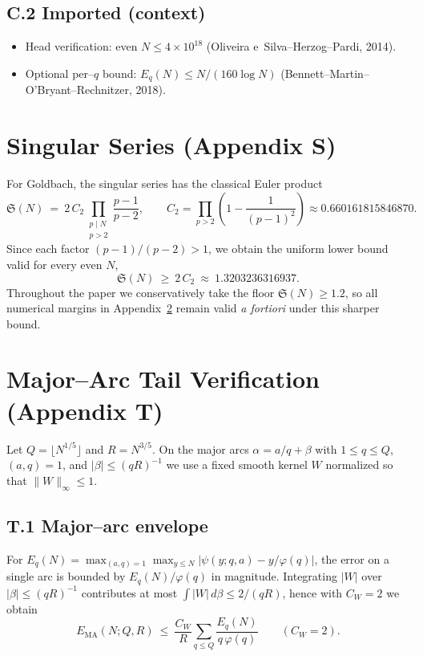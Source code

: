 \documentclass[11pt]{article}
\theoremstyle{remark}
\newcommand{\Sseries}{\mathfrak S}
\newcommand{\QQ}{\ensuremath{Q}}
\newcommand{\RR}{\ensuremath{R}}
\begin{document}
\subsection*{C.2 Imported (context)}
\begin{itemize}
  \item Head verification: even $N\le 4\times 10^{18}$ (Oliveira e~Silva--Herzog--Pardi, 2014).
  \item Optional per–$q$ bound: $E_q(N)\le N/(160\log N)$ (Bennett--Martin--O'Bryant--Rechnitzer, 2018).
\end{itemize}

\section{Singular Series (Appendix S)}\label{app:singular}
For Goldbach, the singular series has the classical Euler product
\[
\Sseries(N)\ =\ 2\,C_2 \prod_{\substack{p\mid N\\ p>2}}\frac{p-1}{p-2},
\qquad
C_2=\prod_{p>2}\left(1-\frac{1}{(p-1)^2}\right)\approx 0.660161815846870.
\]
Since each factor $(p-1)/(p-2)>1$, we obtain the uniform lower bound valid for every even $N$,
\[
\Sseries(N)\ \ge\ 2\,C_2\ \approx\ 1.3203236316937.
\]
Throughout the paper we conservatively take the floor $\Sseries(N)\ge 1.2$, so all numerical margins in Appendix~\ref{app:tail} remain valid \emph{a fortiori} under this sharper bound.

\section{Major--Arc Tail Verification (Appendix T)}\label{app:tail}
Let $\QQ=\lfloor N^{1/5}\rfloor$ and $\RR=N^{3/5}$. On the major arcs $\alpha=a/q+\beta$ with $1\le q\le \QQ$, $(a,q)=1$, and $|\beta|\le (q\RR)^{-1}$ we use a fixed smooth kernel $W$ normalized so that $\|W\|_\infty\le 1$.

\subsection*{T.1 Major–arc envelope}
For $E_q(N)=\max_{(a,q)=1}\max_{y\le N}\bigl|\psi(y;q,a)-y/\varphi(q)\bigr|$, the error on a single arc is bounded by $E_q(N)/\varphi(q)$ in magnitude. Integrating $|W|$ over $|\beta|\le (q\RR)^{-1}$ contributes at most $\int|W|\,d\beta\le 2/(q\RR)$, hence with $C_W=2$ we obtain
\[
E_{\mathrm{MA}}(N;\QQ,\RR)\ \le\ \frac{C_W}{\RR}\sum_{q\le \QQ}\frac{E_q(N)}{q\,\varphi(q)}\qquad (C_W=2).
\]
\end{document}
